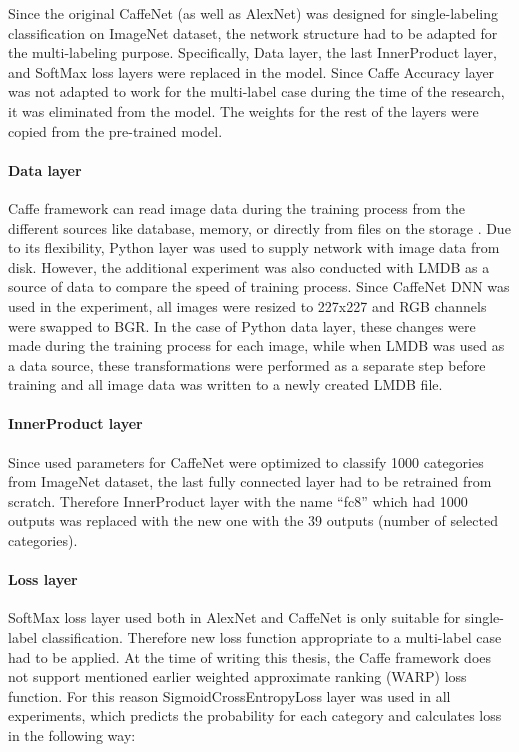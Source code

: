     Since the original CaffeNet (as well as  AlexNet) was designed for single-labeling classification on ImageNet dataset, the network structure had to be adapted for the multi-labeling purpose. Specifically, Data layer, the last InnerProduct layer, and SoftMax loss layers were replaced in the model. Since Caffe Accuracy layer was not adapted to work for the multi-label case during the time of the research, it was eliminated from the model. The weights for the rest of the layers were copied from the pre-trained model.
    
    \paragraph{Data layer}
    Caffe framework can read image data during the training process from the different sources like database, memory, or directly from files on the storage \cite{CaffeLayerCatalogue}. Due to its flexibility, Python layer was used to supply network with image data from disk. However, the additional experiment was also conducted with LMDB \cite{lmdb} as a source of data to compare the speed of training process. Since CaffeNet DNN was used in the experiment, all images were resized to 227x227 and RGB channels were swapped to BGR. In the case of Python data layer, these changes were made during the training process for each image, while when LMDB was used as a data source, these transformations were performed as a separate step before training and all image data was written to a newly created LMDB file.
    
    \paragraph{InnerProduct layer}
    Since used parameters for CaffeNet were optimized to classify 1000 categories from ImageNet dataset, the last fully connected layer had to be retrained from scratch. Therefore InnerProduct layer with the name ``fc8'' which had 1000 outputs was replaced with the new one with the 39 outputs (number of selected categories).
    
    \paragraph{Loss layer}
    SoftMax loss layer used both in AlexNet and CaffeNet is only suitable for single-label classification. Therefore new loss function appropriate to a multi-label case had to be applied. At the time of writing this thesis, the Caffe framework does not support mentioned earlier weighted approximate ranking (WARP) loss function. For this reason SigmoidCrossEntropyLoss layer was used in all experiments, which predicts the probability for each category and calculates loss in the following way:
    
